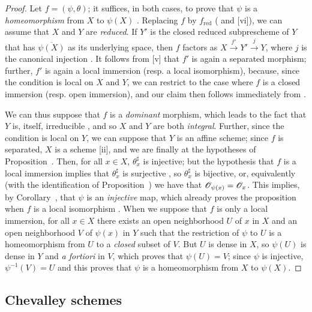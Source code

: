 \begin{proof}
Let $f=(\psi,\theta)$;
it suffices, in both cases, to prove that $\psi$ is a \emph{homeomorphism} from $X$ to $\psi(X)$ .
Replacing $f$ by $f_\text{red}$ ( and [vi]), we can assume that $X$ and $Y$ are \emph{reduced}.
If $Y'$ is the closed reduced subprescheme of $Y$ that has $\overline{\psi(X)}$ as its underlying space, then $f$ factors as $X\xrightarrow{f'}Y'\xrightarrow{j}Y$, where $j$ is the canonical injection .
It follows from [v] that $f'$ is again a separated morphism; further, $f'$ is again
a local immersion (resp. a local isomorphism), because, since the condition is local on $X$ and $Y$, we can restrict to the case where $f$ is a closed immersion (resp. open immersion), and our claim then follows immediately from .

We can thus suppose that $f$ is a \emph{dominant} morphism, which leads to the fact that $Y$ is, itself, irreducible , and so $X$ and $Y$ are both \emph{integral}.
Further, since the condition is local on $Y$, we can suppose that $Y$ is an affine scheme;
since $f$ is separated, $X$ is a scheme [ii], and we are finally at the hypotheses of Proposition~.
Then, for all $x\in X$, $\theta_x^\sharp$ is injective;
but the hypothesis that $f$ is a local immersion implies that $\theta_x^\sharp$ is surjective , so $\theta_x^\sharp$ is bijective, or, equivalently (with the identification of Proposition~) we have that $\mathscr{O}_{\psi(x)}=\mathscr{O}_x$.
This implies, by Corollary~, that $\psi$ is an \emph{injective} map, which already proves the proposition when $f$ is a local isomorphism .
When we suppose that $f$ is only a local immersion, for all $x\in X$ there exists an open neighborhood $U$ of $x$ in $X$ and an open neighborhood $V$ of $\psi(x)$ in $Y$ such that the restriction of $\psi$ to $U$ is a homeomorphism from $U$ to a \emph{closed} subset of $V$.
But $U$ is dense in $X$, so $\psi(U)$ is dense in $Y$ and \emph{a fortiori} in $V$, which proves that $\psi(U)=V$;
since $\psi$ is injective, $\psi^{-1}(V)=U$ and this proves that $\psi$ is a homeomorphism from $X$ to $\psi(X)$.
\end{proof}

\subsection{Chevalley schemes}
\label{subsection:I.8.3}

